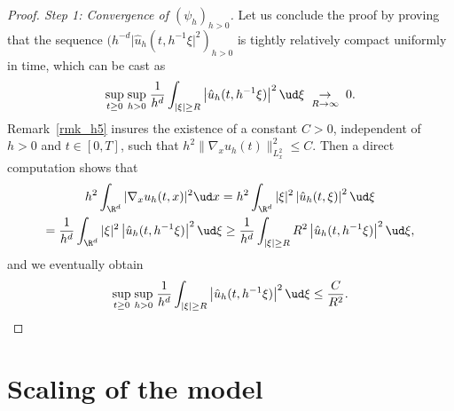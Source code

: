\begin{proof}[Proof. Step 1: Convergence of $(\psi_{h})_{h>0}$]
Let us conclude the proof by proving that the sequence $(h^{-d}|\hat{u}_{h}(t,h^{-1}\xi|^{2})_{h>0}$ is tightly relatively compact uniformly in time, which can be cast as
\[
\underset{t\geq 0}{\sup}\;\underset{h>0}{\sup}\;\frac{1}{h^{d}}\int_{|\xi|\geq R}\left|\hat{u}_{h}(t,h^{-1}\xi)\right|^{2}\ud\xi\;\underset{R\to \infty}{\to}\;0.
\]
Remark~\ref{rmk_h5} insures the existence of a constant $C>0$, independent of $h>0$ and $t\in[0,T]$, such that $h^{2}\|\nabla_{x}u_{h}(t)\|_{L_{x}^{2}}^{2}\leq C$. Then a direct computation shows that
\begin{multline*}
h^{2}\int_{\R^{d}}|\nabla_{x}u_{h}(t,x)|^{2}\ud x=h^{2}\int_{\R^{d}}|\xi|^{2}\left|\hat{u}_{h}(t,\xi)\right|^{2}\ud\xi\\
=\frac{1}{h^{d}}\int_{\R^{d}}|\xi|^{2}\left|\hat{u}_{h}(t,h^{-1}\xi)\right|^{2}\ud\xi\geq\frac{1}{h^{d}}\int_{|\xi|\geq R}R^{2}\left|\hat{u}_{h}(t,h^{-1}\xi)\right|^{2}\ud\xi,
\end{multline*}
and we eventually obtain
\[
\underset{t\geq 0}{\sup}\;\underset{h>0}{\sup}\;\frac{1}{h^{d}}\int_{|\xi|\geq R}\left|\hat{u}_{h}(t,h^{-1}\xi)\right|^{2}\ud\xi\leq \frac{C}{R^{2}}.\qedhere
\]
\end{proof}

\section{Scaling of the model}\label{adim}

